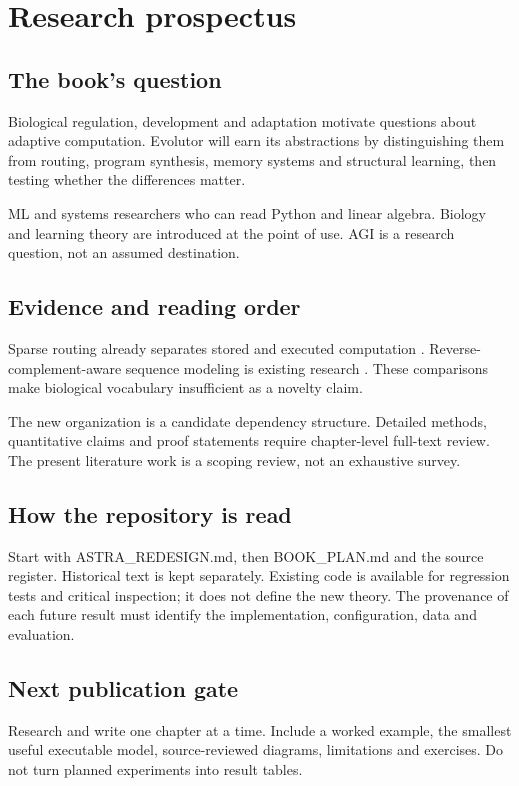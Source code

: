 \chapter*{Research prospectus}
\renewcommand{\thefigure}{P.\arabic{figure}}
\renewcommand{\thedefinition}{P.\arabic{definition}}
\renewcommand{\theproposition}{P.\arabic{proposition}}
\section*{The book's question}
Biological regulation, development and adaptation motivate questions about adaptive computation. Evolutor will earn its abstractions by distinguishing them from routing, program synthesis, memory systems and structural learning, then testing whether the differences matter.

ML and systems researchers who can read Python and linear algebra. Biology and learning theory are introduced at the point of use. AGI is a research question, not an assumed destination.
\section*{Evidence and reading order}
Sparse routing already separates stored and executed computation
\citep{shazeer2017}. Reverse-complement-aware sequence modeling is existing
research \citep{schiff2024}. These comparisons make biological vocabulary
insufficient as a novelty claim.

The new organization is a candidate dependency structure. Detailed methods,
quantitative claims and proof statements require chapter-level full-text review.
The present literature work is a scoping review, not an exhaustive survey.

\section*{How the repository is read}
Start with ASTRA\_REDESIGN.md, then BOOK\_PLAN.md and the source register.
Historical text is kept separately. Existing code is available for regression
tests and critical inspection; it does not define the new theory.
The \gls{provenance} of each future result must identify the
implementation, configuration, data and evaluation.

\section*{Next publication gate}
Research and write one chapter at a time. Include a worked example, the smallest
useful executable model, source-reviewed diagrams, limitations and exercises.
Do not turn planned experiments into result tables.

